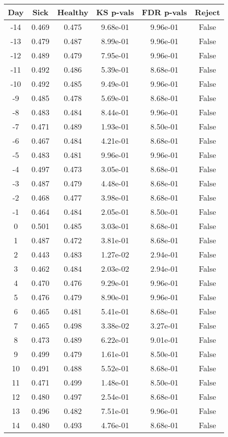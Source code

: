 \begin{tabular}{c|c|c|c|c|c}
Day &  Sick & Healthy &  KS p-vals & FDR p-vals & Reject\\
\hline
-14 & 0.469 &   0.475 &   9.68e-01 &   9.96e-01 &  False\\
-13 & 0.479 &   0.487 &   8.99e-01 &   9.96e-01 &  False\\
-12 & 0.489 &   0.479 &   7.95e-01 &   9.96e-01 &  False\\
-11 & 0.492 &   0.486 &   5.39e-01 &   8.68e-01 &  False\\
-10 & 0.492 &   0.485 &   9.49e-01 &   9.96e-01 &  False\\
 -9 & 0.485 &   0.478 &   5.69e-01 &   8.68e-01 &  False\\
 -8 & 0.483 &   0.484 &   8.44e-01 &   9.96e-01 &  False\\
 -7 & 0.471 &   0.489 &   1.93e-01 &   8.50e-01 &  False\\
 -6 & 0.467 &   0.484 &   4.21e-01 &   8.68e-01 &  False\\
 -5 & 0.483 &   0.481 &   9.96e-01 &   9.96e-01 &  False\\
 -4 & 0.497 &   0.473 &   3.05e-01 &   8.68e-01 &  False\\
 -3 & 0.487 &   0.479 &   4.48e-01 &   8.68e-01 &  False\\
 -2 & 0.468 &   0.477 &   3.98e-01 &   8.68e-01 &  False\\
 -1 & 0.464 &   0.484 &   2.05e-01 &   8.50e-01 &  False\\
  0 & 0.501 &   0.485 &   3.03e-01 &   8.68e-01 &  False\\
  1 & 0.487 &   0.472 &   3.81e-01 &   8.68e-01 &  False\\
  2 & 0.443 &   0.483 &   1.27e-02 &   2.94e-01 &  False\\
  3 & 0.462 &   0.484 &   2.03e-02 &   2.94e-01 &  False\\
  4 & 0.470 &   0.476 &   9.29e-01 &   9.96e-01 &  False\\
  5 & 0.476 &   0.479 &   8.90e-01 &   9.96e-01 &  False\\
  6 & 0.465 &   0.481 &   5.41e-01 &   8.68e-01 &  False\\
  7 & 0.465 &   0.498 &   3.38e-02 &   3.27e-01 &  False\\
  8 & 0.473 &   0.489 &   6.22e-01 &   9.01e-01 &  False\\
  9 & 0.499 &   0.479 &   1.61e-01 &   8.50e-01 &  False\\
 10 & 0.491 &   0.488 &   5.52e-01 &   8.68e-01 &  False\\
 11 & 0.471 &   0.499 &   1.48e-01 &   8.50e-01 &  False\\
 12 & 0.480 &   0.497 &   2.54e-01 &   8.68e-01 &  False\\
 13 & 0.496 &   0.482 &   7.51e-01 &   9.96e-01 &  False\\
 14 & 0.480 &   0.493 &   4.76e-01 &   8.68e-01 &  False\\
\end{tabular}